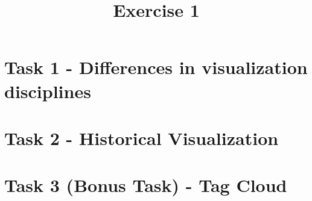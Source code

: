 \documentclass[a4paper]{article}
\date{}
\author{}
\title{Exercise 1}
\begin{document}
	\maketitle 
	\thispagestyle{fancy}
	
	\section*{Task 1 - Differences in visualization disciplines}
	
	\section*{Task 2 - Historical Visualization}
	
	\section*{Task 3 (Bonus Task) - Tag Cloud}
\end{document}
